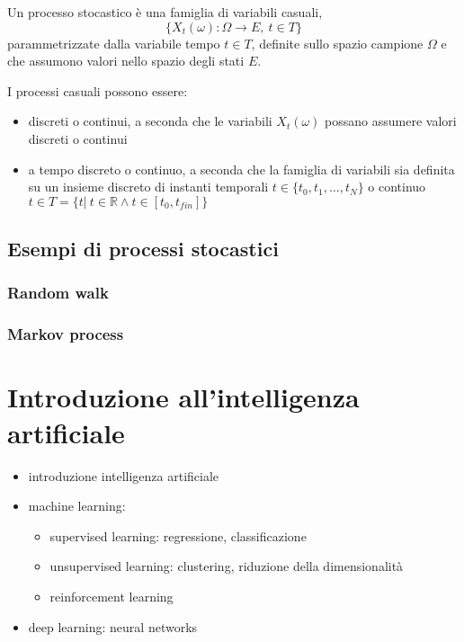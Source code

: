 \begin{definition} Un processo stocastico è una famiglia di variabili casuali,
    \begin{equation}
        \{ X_t(\omega): \Omega \rightarrow E, \ t \in T \}
    \end{equation}
    parammetrizzate dalla variabile tempo $t \in T$, definite sullo spazio campione $\Omega$ e che assumono valori nello spazio degli stati $E$.
\end{definition}
I processi casuali possono essere:
\begin{itemize}
    \item discreti o continui, a seconda che le variabili $X_t(\omega)$ possano assumere valori discreti o continui
    \item a tempo discreto o continuo, a seconda che la famiglia di variabili sia definita su un insieme discreto di instanti temporali $t \in \{t_0, t_1, \dots, t_N \}$ o continuo $t \in T = \{ t| \ t \in \mathbb{R} \land t \in [t_0, t_{fin}] \}$
\end{itemize}

\section{Esempi di processi stocastici}
\subsection{Random walk}
\subsection{Markov process}

\chapter{Introduzione all'intelligenza artificiale}
\begin{itemize}
  \item introduzione intelligenza artificiale
  \item machine learning:
  \begin{itemize}
    \item supervised learning: regressione, classificazione
    \item unsupervised learning: clustering, riduzione della dimensionalità
    \item reinforcement learning
  \end{itemize}
  \item deep learning: neural networks
\end{itemize}


